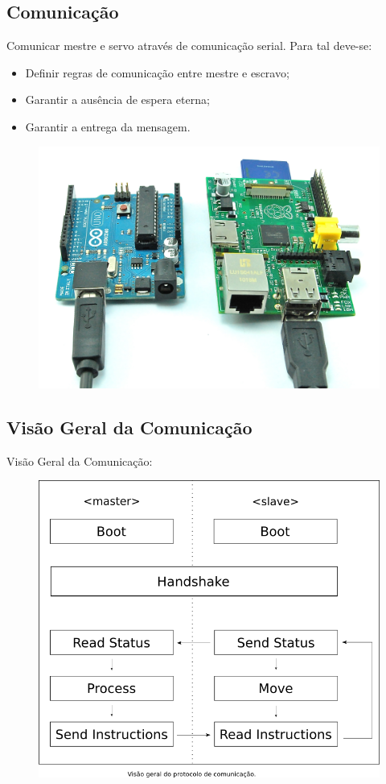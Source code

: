 \documentclass{beamer}
\begin{document}
\subsection{Comunicação}
\begin{frame}
  \centering
  Comunicar mestre e servo através de comunicação serial. Para tal deve-se:
    \begin{itemize}
        \item Definir regras de comunicação entre mestre e escravo;
        \item Garantir a ausência de espera eterna;
        \item Garantir a entrega da mensagem.
    \end{itemize}
    \begin{figure}
    \centering
    \includegraphics[width=0.4\linewidth]{arduinopi}
  \end{figure}
\end{frame}

\subsection{Visão Geral da Comunicação}
\begin{frame}
  Visão Geral da Comunicação:
    \begin{figure}
    \centering
    \includegraphics[width=0.6\linewidth]{visao-geral}
  \end{figure}
\end{frame}
\end{document}
